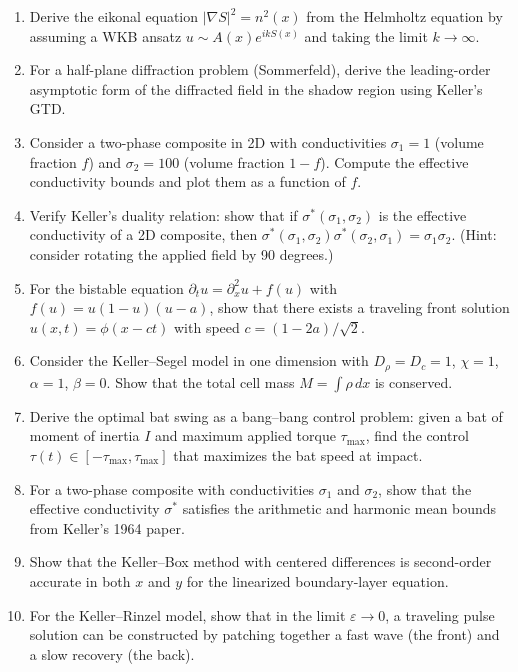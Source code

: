 \begin{enumerate}
  \item [I] Derive the eikonal equation \(|\nabla S|^2 = n^2(x)\) from the Helmholtz equation by assuming a WKB ansatz \(u \sim A(x) e^{ikS(x)}\) and taking the limit \(k \to \infty\).
  \item [I] For a half-plane diffraction problem (Sommerfeld), derive the leading-order asymptotic form of the diffracted field in the shadow region using Keller's GTD.
  \item [I] Consider a two-phase composite in 2D with conductivities \(\sigma_1 = 1\) (volume fraction \(f\)) and \(\sigma_2 = 100\) (volume fraction \(1-f\)). Compute the effective conductivity bounds and plot them as a function of \(f\).
  \item [I] Verify Keller's duality relation: show that if \(\sigma^*(\sigma_1, \sigma_2)\) is the effective conductivity of a 2D composite, then \(\sigma^*(\sigma_1, \sigma_2) \sigma^*(\sigma_2, \sigma_1) = \sigma_1 \sigma_2\). (Hint: consider rotating the applied field by 90 degrees.)
  \item [I] For the bistable equation \(\partial_t u = \partial_x^2 u + f(u)\) with \(f(u) = u(1-u)(u-a)\), show that there exists a traveling front solution \(u(x, t) = \phi(x - ct)\) with speed \(c = (1-2a)/\sqrt{2}\).
  \item [B] Consider the Keller--Segel model in one dimension with \(D_\rho = D_c = 1\), \(\chi = 1\), \(\alpha = 1\), \(\beta = 0\). Show that the total cell mass \(M = \int \rho\, dx\) is conserved.
  \item [I] Derive the optimal bat swing as a bang--bang control problem: given a bat of moment of inertia \(I\) and maximum applied torque \(\tau_{\max}\), find the control \(\tau(t) \in [-\tau_{\max}, \tau_{\max}]\) that maximizes the bat speed at impact.
  \item [B] For a two-phase composite with conductivities \(\sigma_1\) and \(\sigma_2\), show that the effective conductivity \(\sigma^*\) satisfies the arithmetic and harmonic mean bounds from Keller's 1964 paper.
  \item [I] Show that the Keller--Box method with centered differences is second-order accurate in both \(x\) and \(y\) for the linearized boundary-layer equation.
  \item [B] For the Keller--Rinzel model, show that in the limit \(\varepsilon \to 0\), a traveling pulse solution can be constructed by patching together a fast wave (the front) and a slow recovery (the back).

\end{enumerate}
